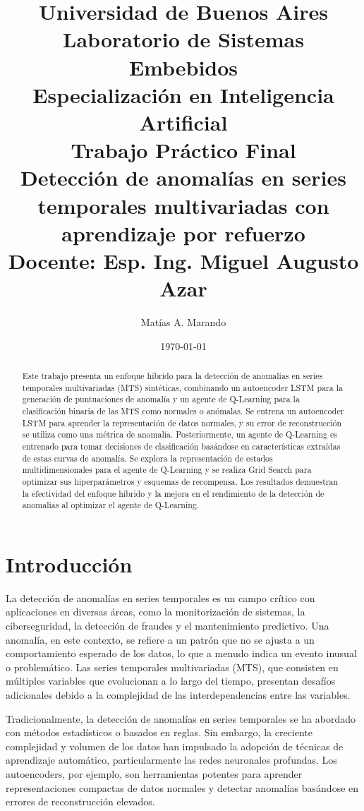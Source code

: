 \documentclass[12pt]{article}
\title{
    \vspace{-2cm}
    \normalsize \textbf{Universidad de Buenos Aires} \\
    \textbf{Laboratorio de Sistemas Embebidos} \\
    \textbf{Especialización en Inteligencia Artificial} \\
    \vspace{0.5cm}
    {Trabajo Práctico Final} \\
    \vspace{1cm}
    \Large \textbf{Detección de anomalías en series temporales multivariadas con aprendizaje por refuerzo} \\
    \vspace{1cm}
    \large Docente: Esp. Ing. Miguel Augusto Azar
    \vspace{1cm}
}
\author{
    Matías A. Marando
    \vspace{1cm}
}
\date{\today}
\begin{document}
\justifying
\maketitle


\begin{abstract}
Este trabajo presenta un enfoque híbrido para la detección de anomalías en series temporales multivariadas (MTS) sintéticas, combinando un autoencoder LSTM para la generación de puntuaciones de anomalía y un agente de Q-Learning para la clasificación binaria de las MTS como normales o anómalas.
Se entrena un autoencoder LSTM para aprender la representación de datos normales, y su error de reconstrucción se utiliza como una métrica de anomalía.
Posteriormente, un agente de Q-Learning es entrenado para tomar decisiones de clasificación basándose en características extraídas de estas curvas de anomalía.
Se explora la representación de estados multidimensionales para el agente de Q-Learning y se realiza Grid Search para optimizar sus hiperparámetros y esquemas de recompensa.
Los resultados demuestran la efectividad del enfoque híbrido y la mejora en el rendimiento de la detección de anomalías al optimizar el agente de Q-Learning.
\end{abstract}


\newpage
\section{Introducción}
\label{sec:intro}

La detección de anomalías en series temporales es un campo crítico con aplicaciones en diversas áreas, como la monitorización de sistemas, la ciberseguridad, la detección de fraudes y el mantenimiento predictivo. Una anomalía, en este contexto, se refiere a un patrón que no se ajusta a un comportamiento esperado de los datos, lo que a menudo indica un evento inusual o problemático. Las series temporales multivariadas (MTS), que consisten en múltiples variables que evolucionan a lo largo del tiempo, presentan desafíos adicionales debido a la complejidad de las interdependencias entre las variables.

Tradicionalmente, la detección de anomalías en series temporales se ha abordado con métodos estadísticos o basados en reglas.
Sin embargo, la creciente complejidad y volumen de los datos han impulsado la adopción de técnicas de aprendizaje automático, particularmente las redes neuronales profundas.
Los autoencoders, por ejemplo, son herramientas potentes para aprender representaciones compactas de datos normales y detectar anomalías basándose en errores de reconstrucción elevados.
\end{document}
